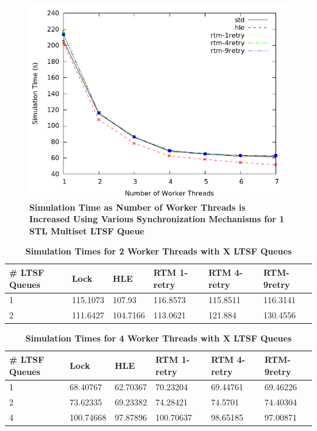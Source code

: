 \documentclass[a4paper]{article}
\begin{document}
\begin{figure}[H]
    \centering
    \graphicspath{ {./data/} }
    \includegraphics[width=\textwidth,height=\textheight,keepaspectratio]{noThrMig-summary-multiset-hugeepidemicsim-timeVSthreads-1schQ}
    \caption{\textbf{Simulation Time as Number of Worker Threads is Increased
    Using Various Synchronization Mechanisms for 1 STL Multiset LTSF Queue}}
    \label{fig:noThrMig_timeVSthreads_1schq}
\end{figure}

\begin{table}[H]
    \centering
    \begin{tabular}{l|p{2cm}|p{2cm}|p{2cm}|p{2cm}|p{2cm}}
        \textbf{\# LTSF Queues}&Lock &HLE &RTM 1-retry &RTM 4-retry &RTM-9retry \\
        \hline
        \midrule
            1 &115.1073 &107.93   &116.8573 &115.8511 &116.3141 \\ 
            2 &111.6427 &104.7166 &113.0621 &121.884  &130.4556   
    \end{tabular}
    \caption{\textbf{Simulation Times for 2 Worker Threads with X LTSF Queues}}
    \label{tab:noThrMig_2threadsXschq}
\end{table}

\begin{table}[H]
    \centering
    \begin{tabular}{l|p{2cm}|p{2cm}|p{2cm}|p{2cm}|p{2cm}}
        \textbf{\# LTSF Queues}&Lock &HLE &RTM 1-retry &RTM 4-retry &RTM-9retry \\
        \hline
        \midrule
            1 &68.40767  &62.70367 &70.23204  &69.44761 &69.46226 \\ 
            2 &73.62335  &69.23382 &74.28421  &74.5701  &74.40304 \\
            4 &100.74668 &97.87896 &100.70637 &98.65185 &97.00871 
    \end{tabular}
    \caption{\textbf{Simulation Times for 4 Worker Threads with X LTSF Queues}}
    \label{tab:noThrMig_6threadsXschq}
\end{table}
\end{document}
